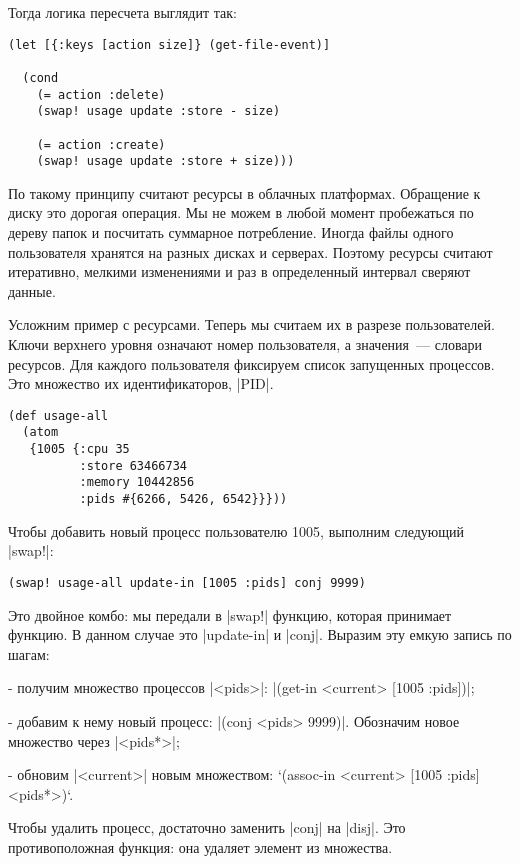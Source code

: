 Тогда логика пересчета выглядит так:

\begin{verbatim}
(let [{:keys [action size]} (get-file-event)]

  (cond
    (= action :delete)
    (swap! usage update :store - size)

    (= action :create)
    (swap! usage update :store + size)))
\end{verbatim}

По такому принципу считают ресурсы в облачных платформах. Обращение к диску это
дорогая операция. Мы не можем в любой момент пробежаться по дереву папок и
посчитать суммарное потребление. Иногда файлы одного пользователя хранятся на
разных дисках и серверах. Поэтому ресурсы считают итеративно, мелкими
изменениями и раз в определенный интервал сверяют данные.

Усложним пример с ресурсами. Теперь мы считаем их в разрезе пользователей. Ключи
верхнего уровня означают номер пользователя, а значения~--- словари ресурсов. Для
каждого пользователя фиксируем список запущенных процессов. Это множество их
идентификаторов, \spverb|PID|.

\begin{verbatim}
(def usage-all
  (atom
   {1005 {:cpu 35
          :store 63466734
          :memory 10442856
          :pids #{6266, 5426, 6542}}}))
\end{verbatim}

Чтобы добавить новый процесс пользователю 1005, выполним следующий \spverb|swap!|:

\begin{verbatim}
(swap! usage-all update-in [1005 :pids] conj 9999)
\end{verbatim}

Это двойное комбо: мы передали в \spverb|swap!| функцию, которая принимает функцию. В
данном случае это \spverb|update-in| и \spverb|conj|. Выразим эту емкую запись по шагам:

- получим множество процессов \spverb|<pids>|: \spverb|(get-in <current> [1005 :pids])|;

- добавим к нему новый процесс: \spverb|(conj <pids> 9999)|. Обозначим новое множество
  через \spverb|<pids*>|;

- обновим \spverb|<current>| новым множеством: `(assoc-in <current> [1005 :pids]
  <pids*>)`.

Чтобы удалить процесс, достаточно заменить \spverb|conj| на \spverb|disj|. Это противоположная
функция: она удаляет элемент из множества.

